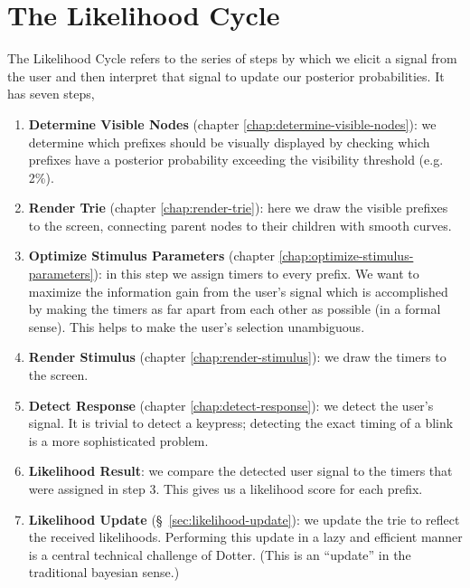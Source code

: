 \section{The Likelihood Cycle}
The Likelihood Cycle refers to the series of steps by which we elicit
a signal from the user and then interpret that signal to update our
posterior probabilities. It has seven steps,
\begin{enumerate}
  \item \textbf{Determine Visible Nodes} (chapter \ref{chap:determine-visible-nodes}): we determine which prefixes should be visually displayed
  by checking which prefixes have a posterior probability exceeding the visibility threshold (e.g. 2\%).
  \item \textbf{Render Trie} (chapter \ref{chap:render-trie}): here we draw the visible prefixes to the screen, connecting parent nodes to their
  children with smooth curves.
  \item \textbf{Optimize Stimulus Parameters} (chapter \ref{chap:optimize-stimulus-parameters}): in this step we assign timers to every prefix. 
  We want to maximize the information gain from the user's signal which is accomplished by making the timers as
  far apart from each other as possible (in a formal sense). This helps to make the user's selection unambiguous.
  \item \textbf{Render Stimulus} (chapter \ref{chap:render-stimulus}): we draw the timers to the screen.
  \item \textbf{Detect Response} (chapter \ref{chap:detect-response}): we detect the user's signal. It is trivial to detect a keypress; detecting the exact timing of a blink is a more sophisticated problem.
  \item \textbf{Likelihood Result}: we compare the detected user signal to the timers that were assigned in step 3.
  This gives us a likelihood score for each prefix.
  \item \textbf{Likelihood Update} (\S~\ref{sec:likelihood-update}): we update the trie to reflect the received likelihoods.
  Performing this update in a lazy and efficient manner is a central technical
  challenge of Dotter.
  (This is an ``update'' in the traditional bayesian sense.)
\end{enumerate}

